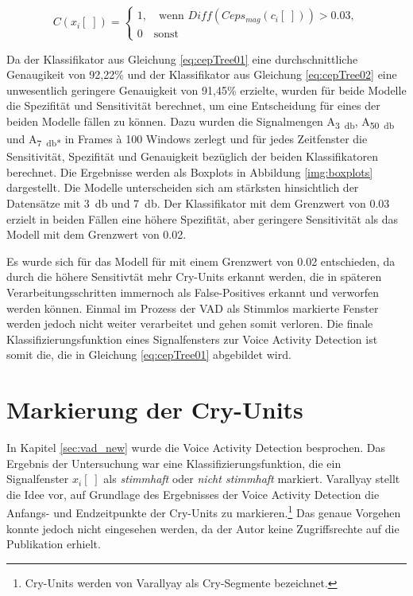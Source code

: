 \begin{equation}
C(x_i[\;]) = \begin{cases}
1, \quad \text{wenn } Diff(Ceps_{mag}(c_i[\;])) > 0.03, \\
0 \quad \text{sonst}
\end{cases}
\label{eq:cepTree02}
\end{equation}

Da der Klassifikator aus Gleichung \ref{eq:cepTree01} eine durchschnittliche Genaugikeit von 92,22\% und der Klassifikator aus Gleichung \ref{eq:cepTree02} eine unwesentlich geringere Genauigkeit von 91,45\% erzielte, wurden für beide Modelle die Spezifität und Sensitivität berechnet, um eine Entscheidung für eines der beiden Modelle fällen zu können. Dazu wurden die Signalmengen A\textsubscript{\SI{3}{\decibel}}, A\textsubscript{\SI{50}{\decibel}} und A\textsubscript{\SI{7}{\decibel}*} in Frames \`{a} 100 Windows zerlegt und für jedes Zeitfenster die Sensitivität, Spezifität und Genauigkeit bezüglich der beiden Klassifikatoren berechnet. Die Ergebnisse werden als Boxplots in Abbildung \ref{img:boxplots} dargestellt. Die Modelle unterscheiden sich am stärksten hinsichtlich der Datensätze mit \SI{3}{\decibel} und \SI{7}{\decibel}. Der Klassifikator mit dem Grenzwert von 0.03 erzielt in beiden Fällen eine höhere Spezifität, aber geringere Sensitivität als das Modell mit dem Grenzwert von 0.02. 

Es wurde sich für das Modell für mit einem Grenzwert von 0.02 entschieden, da durch die höhere Sensitivtät mehr Cry-Units erkannt werden, die in späteren Verarbeitungsschritten immernoch als False-Positives erkannt und verworfen werden können. Einmal im Prozess der VAD als Stimmlos markierte Fenster werden jedoch nicht weiter verarbeitet und gehen somit \glqq verloren\grqq. Die finale Klassifizierungsfunktion eines Signalfensters zur Voice Activity Detection ist somit die, die in Gleichung \ref{eq:cepTree01} abgebildet wird.

\section{Markierung der Cry-Units}
\label{sec:marking_cry-units_new}

In Kapitel \ref{sec:vad_new} wurde die Voice Activity Detection besprochen. Das Ergebnis der Untersuchung war eine Klassifizierungsfunktion, die ein Signalfenster $x_i[\;]$ als \emph{stimmhaft} oder \emph{nicht stimmhaft} markiert. Varallyay \cite[S. 16 - 17]{cry_thesis} stellt die Idee vor, auf Grundlage des Ergebnisses der Voice Activity Detection die Anfangs- und Endzeitpunkte der Cry-Units zu markieren.\footnote{\glqq Cry-Units \grqq{} werden von Varallyay als \glqq Cry-Segmente \grqq{} bezeichnet.} Das genaue Vorgehen konnte jedoch nicht eingesehen werden, da der Autor keine Zugriffsrechte auf die Publikation erhielt.


